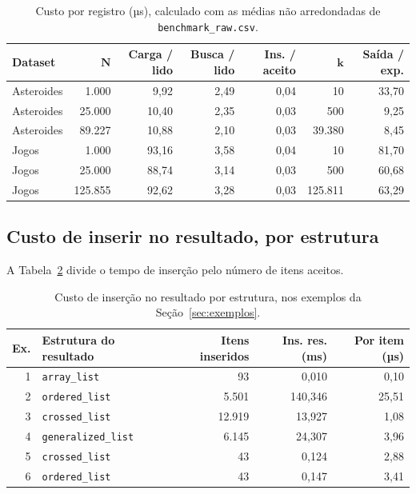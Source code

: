\documentclass[11pt,a4paper]{article}
\newcommand{\cab}[1]{\rowcolor{gray!22}#1}
\begin{document}
\begin{table}[!htbp]
\centering
\caption{Custo por registro (µs), calculado com as médias não arredondadas de \texttt{benchmark\_raw.csv}.}
\label{tab:custo-registro}
\small
\setlength{\tabcolsep}{5pt}
\begin{tabular}{@{}l r r r r r r@{}}
\toprule
\cab{\textbf{Dataset} & $\boldsymbol{N}$ & \textbf{Carga / lido} & \textbf{Busca / lido} & \textbf{Ins. / aceito} & $\boldsymbol{k}$ & \textbf{Saída / exp.}} \\
\midrule
Asteroides & 1.000 & 9,92 & 2,49 & 0,04 & 10 & 33,70 \\
Asteroides & 25.000 & 10,40 & 2,35 & 0,03 & 500 & 9,25 \\
Asteroides & 89.227 & 10,88 & 2,10 & 0,03 & 39.380 & 8,45 \\
Jogos & 1.000 & 93,16 & 3,58 & 0,04 & 10 & 81,70 \\
Jogos & 25.000 & 88,74 & 3,14 & 0,03 & 500 & 60,68 \\
Jogos & 125.855 & 92,62 & 3,28 & 0,03 & 125.811 & 63,29 \\
\bottomrule
\end{tabular}
\end{table}

\subsection{Custo de inserir no resultado, por estrutura}

A Tabela~\ref{tab:insercao} divide o tempo de inserção pelo número de itens aceitos.

\begin{table}[!htbp]
\centering
\caption{Custo de inserção no resultado por estrutura, nos exemplos da Seção~\ref{sec:exemplos}.}
\label{tab:insercao}
\small
\begin{tabular}{@{}r l r r r@{}}
\toprule
\cab{\textbf{Ex.} & \textbf{Estrutura do resultado} & \textbf{Itens inseridos} & \textbf{Ins. res. (ms)} & \textbf{Por item (µs)}} \\
\midrule
1 & \texttt{array\_\allowbreak{}list} & 93 & 0,010 & 0,10 \\
2 & \texttt{ordered\_\allowbreak{}list} & 5.501 & 140,346 & 25,51 \\
3 & \texttt{crossed\_\allowbreak{}list} & 12.919 & 13,927 & 1,08 \\
4 & \texttt{generalized\_\allowbreak{}list} & 6.145 & 24,307 & 3,96 \\
5 & \texttt{crossed\_\allowbreak{}list} & 43 & 0,124 & 2,88 \\
6 & \texttt{ordered\_\allowbreak{}list} & 43 & 0,147 & 3,41 \\
\bottomrule
\end{tabular}
\end{table}
\end{document}

